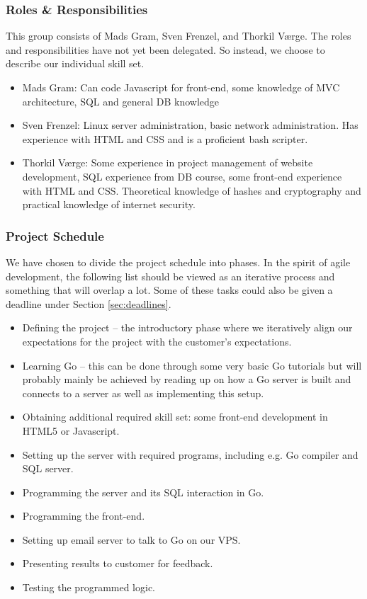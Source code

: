 \documentclass[11pt,a4paper]{article}
\begin{document}
\subsubsection{Roles \& Responsibilities}
This group consists of Mads Gram, Sven Frenzel, and Thorkil Værge. The roles and responsibilities have not yet been delegated. So instead, we choose to describe our individual skill set.
\begin{itemize}
\item Mads Gram: Can code Javascript for front-end, some knowledge of MVC architecture, SQL and general DB knowledge
\item Sven Frenzel: Linux server administration, basic network administration. Has experience with HTML and CSS and is a proficient bash scripter.
\item Thorkil Værge: Some experience in project management of website development, SQL experience from DB course, some front-end experience with HTML and CSS. Theoretical knowledge of hashes and cryptography and practical knowledge of internet security.
\end{itemize}
\subsubsection{Project Schedule}
We have chosen to divide the project schedule into phases. In the spirit of agile development, the following list should be viewed as an iterative process and something that will overlap a lot. Some of these tasks could also be given a deadline under Section \ref{sec:deadlines}.
\begin{itemize}
\item Defining the project -- the introductory phase where we iteratively align our expectations for the project with the customer's expectations.
\item Learning Go -- this can be done through some very basic Go tutorials but will probably mainly be achieved by reading up on how a Go server is built and connects to a server as well as implementing this setup.
\item Obtaining additional required skill set: some front-end development in HTML5 or Javascript.
\item Setting up the server with required programs, including e.g. Go compiler and SQL server.
\item Programming the server and its SQL interaction in Go.
\item Programming the front-end.
\item Setting up email server to talk to Go on our VPS.
\item Presenting results to customer for feedback.
\item Testing the programmed logic.
\end{itemize}
\end{document}
